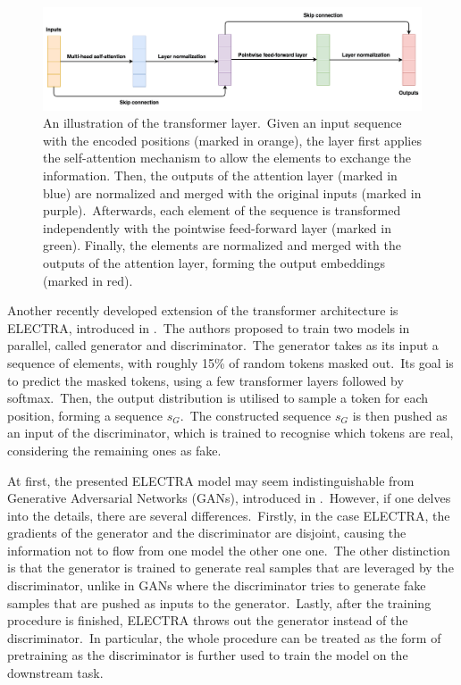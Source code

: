 \documentclass[longabstract, english, mgr]{iithesis}
\theoremstyle{default_theorem_style}\newtheorem{theorem}{Theorem}
\theoremstyle{default_theorem_style}\newtheorem{definition}{Definition}
\begin{document}
\begin{figure}[t]
\centering
\includegraphics[scale=0.33]{transformer_layer}
\caption{An illustration of the transformer layer.\ Given an input sequence with the encoded positions
(marked in orange), the layer first applies the self-attention mechanism to allow the elements to exchange the
information. Then, the outputs of the attention layer (marked in blue) are normalized and merged with the original
inputs (marked in purple).\ Afterwards, each element of the sequence is transformed independently with the pointwise
feed-forward layer (marked in green). Finally, the elements are normalized and merged with the outputs of the attention
layer, forming the output embeddings (marked in red).}
\label{fig:transformer_layer}
\end{figure}

\noindent Another recently developed extension of the transformer architecture is ELECTRA, introduced
in \cite{electra_model}.\ The authors proposed to train two models in parallel, called generator and
discriminator.\ The generator takes as its input a sequence of elements, with roughly 15\% of random tokens masked
out.\ Its goal is to predict the masked tokens, using a few transformer layers followed by softmax.\ Then, the output
distribution is utilised to sample a token for each position, forming a sequence $s_G$.\ The constructed sequence
$s_G$ is then pushed as an input of the discriminator, which is trained to recognise which tokens are real, considering
the remaining ones as fake.\newline

\noindent At first, the presented ELECTRA model may seem indistinguishable from Generative Adversarial Networks
(GANs), introduced in \cite{gan}.\ However, if one delves into the details, there are several differences.\ Firstly,
in the case ELECTRA, the gradients of the generator and the discriminator are disjoint, causing the
information not to flow from one model the other one one.\ The other distinction is that the generator
is trained to generate real samples that are leveraged by the discriminator, unlike in GANs where the
discriminator tries to generate fake samples that are pushed as inputs to the generator.\ Lastly, after the
training procedure is finished, ELECTRA throws out the generator instead of the discriminator.\ In particular, the
whole procedure can be treated as the form of pretraining as the discriminator is further used to train the model on the
downstream task.
\end{document}
